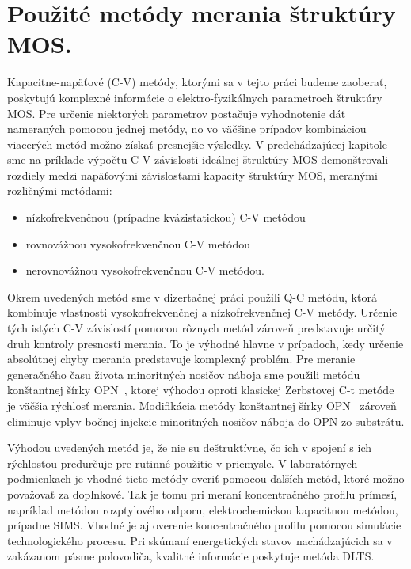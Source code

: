 
\chapter{Použité metódy merania štruktúry MOS.}\label{Chapter3}

Kapacitne-napäťové (C-V) metódy, ktorými sa v tejto práci budeme
zaoberať, poskytujú komplexné informácie o elektro-fyzikálnych
parametroch štruktúry MOS\@. Pre určenie niektorých parametrov
postačuje vyhodnotenie dát nameraných pomocou jednej metódy, no vo
väčšine prípadov kombináciou viacerých metód možno získať presnejšie
výsledky.  V predchádzajúcej kapitole sme na príklade výpočtu C-V
závislosti ideálnej štruktúry MOS demonštrovali rozdiely medzi
napäťovými závislosťami kapacity štruktúry MOS, meranými rozličnými
metódami:

\begin{itemize}
\item nízkofrekvenčnou (prípadne kvázistatickou) C-V metódou
\item rovnovážnou vysokofrekvenčnou C-V metódou
\item nerovnovážnou vysokofrekvenčnou C-V metódou.
\end{itemize}

Okrem uvedených metód sme v dizertačnej práci použili Q-C metódu,
ktorá kombinuje vlastnosti vysokofrekvenčnej a nízkofrekvenčnej C-V
metódy. Určenie tých istých C-V závislostí pomocou rôznych metód
zároveň predstavuje určitý druh kontroly presnosti merania.  To je
výhodné hlavne v prípadoch, kedy určenie absolútnej chyby merania
predstavuje komplexný problém. Pre meranie generačného času života
minoritných nosičov náboja sme použili metódu konštantnej šírky
OPN~\cite{3.1}, ktorej výhodou oproti klasickej Zerbstovej C-t
metóde~\cite{3.2} je väčšia rýchlosť merania. Modifikácia metódy
konštantnej šírky OPN~\cite{3.3} zároveň eliminuje vplyv bočnej
injekcie minoritných nosičov náboja do OPN zo substrátu.

Výhodou uvedených metód je, že nie su deštruktívne, čo ich v spojení s
ich rýchlosťou predurčuje pre rutinné použitie v priemysle.  V
laboratórnych podmienkach je vhodné tieto metódy overiť pomocou
ďalších metód, ktoré možno považovať za doplnkové. Tak je tomu pri
meraní koncentračného profilu prímesí, napríklad metódou rozptylového
odporu, elektrochemickou kapacitnou metódou, prípadne SIMS\@. Vhodné
je aj overenie koncentračného profilu pomocou simulácie
technologického procesu. Pri skúmaní energetických stavov
nachádzajúcich sa v zakázanom pásme polovodiča, kvalitné informácie
poskytuje metóda DLTS\@.

